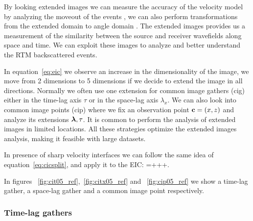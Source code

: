 By looking extended images we can measure the accuracy of the velocity model by analyzing the moveout of the events
 \citep{yang:S151}, we can also perform transformations from the extended domain to angle domain 
\citep{sava:S209,sava:S131}. The extended  images provides us a measurement of the similarity between the source
 and receiver wavefields along space and time.
 We can exploit these images to analyze and better understand the RTM backscattered events.

In equation~\ref{eq:eic} we observe an increase in the dimensionality of the image, we move from 2 dimensions to 5 dimensions
if we decide to extend the image in all directions. Normally we often use one extension for common image gathers (cig) either
in the time-lag axis $\tau$ or in the space-lag axis $\lambda_x$. We can also look into common image points (cip) where we 
fix an observation point ${\bf c}=(x,z)$ and analyze its extensions ${\boldsymbol{\lambda}},\tau$. It is common to perform the analysis 
of extended images in limited locations. All these strategies optimize the extended images analysis, making it feasible with 
large datasets.

In presence of sharp velocity interfaces we can follow the same idea of equation~\ref{eq:cicsplit}, and apply it to the EIC:
\beq
\Re=+++.
\label{eq:eicsplit}
\eeq

In figures ~\ref{fig:cit05_ref},~\ref{fig:citx05_ref} and ~\ref{fig:cip05_ref} we show a time-lag gather, a space-lag gather
 and a common image point respectively.

\subsubsection{Time-lag gathers}

